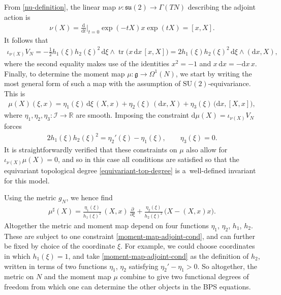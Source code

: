 \documentclass[pdftex]{sigma}
\newcommand{\II}{{\mathcal{I}}}
\newcommand{\g}{{\mathfrak{g}}}
\newcommand{\su}{{\mathfrak{su}}}
\newcommand{\SU}{{\mathrm{SU}}}
\newcommand{\R}{{\mathbb{R}}}
\newcommand{\1}{{\mathbb{1}}}
\newcommand{\bdy}{\partial}
\def \d{\mathrm{d}}
\newcommand{\tr}{{\operatorname{tr}}}
\numberwithin{equation}{section}
\begin{document}
From \eqref{nu-definition}, the linear map $\nu\colon \su(2)\to \Gamma(TN)$ describing the adjoint action is
\begin{align}
 \nu(X)=\frac{\d}{\d t}\Big|_{t=0}\exp(-tX)x\exp(tX)=[x,X].\label{adjoint-action}
\end{align}
It follows that
\begin{align*}
 \iota_{\nu(X)}V_N=-\tfrac{1}{2}h_1(\xi)h_2(\xi)^2\,\d\xi \wedge\tr\bigl(x\,\d x\, [x,X]\bigr) = 2h_1(\xi)h_2(\xi)^2\,\d\xi \wedge (\d x,X),
\end{align*}
where the second equality makes use of the identities $x^2=-1$ and $x\,\d x = -\d x\, x$. Finally, to determine the moment map $\mu\colon \g\to\Omega^1(N)$, we start by writing the most general form of such a map with the assumption of $\SU(2)$-equivariance. This is
\begin{align}\label{moment-map-adjoint}
 \mu(X)(\xi,x)=\eta_1(\xi)\,\d\xi\,(X,x)+\eta_2(\xi)\,(\d x,X)+\eta_3(\xi)\,\bigl(\d x,[X,x]\bigr),
\end{align}
where $\eta_1, \eta_2, \eta_3\colon \II\to\R$ are smooth. Imposing the constraint $\d\mu(X)=\iota_{\nu(X)}V_N$ forces
\begin{align}\label{moment-map-adjoint-cond}
 2h_1(\xi)h_2(\xi)^2=\eta_2'(\xi)-\eta_1(\xi),\qquad\eta_3(\xi)=0.
\end{align}
It is straightforwardly verified that these constraints on $\mu$ also allow for $\iota_{\nu(X)}\mu(X)=0$, and so in this case all conditions are satisfied so that the equivariant topological degree \eqref{equivariant-top-degree} is a~well-defined invariant for this model.

Using the metric $g_N$, we hence find
\begin{align}\label{sharped-moment-adjoint}
 \mu^\sharp(X)=\frac{\eta_1(\xi)}{h_1(\xi)^2}\,(X,x)\,
 \frac{\bdy}{\bdy\xi}+\frac{\eta_2(\xi)}{h_2(\xi)^2}\,\bigl(X-(X,x)x\bigr).
\end{align}
Altogether the metric and moment map depend on four functions $\eta_1$, $\eta_2$, $h_1$, $h_2$. These are subject to one constraint \eqref{moment-map-adjoint-cond}, and can further be fixed by choice of the coordinate $\xi$. For example, we could choose coordinates in which $h_1(\xi)=1$, and take \eqref{moment-map-adjoint-cond} as the definition of $h_2$, written in terms of two functions $\eta_1$, $\eta_2$ satisfying $\eta_2'-\eta_1>0$. So altogether, the metric on $N$ and the moment map $\mu$ combine to give two functional degrees of freedom from which one can determine the other objects in the BPS equations.
\end{document}
